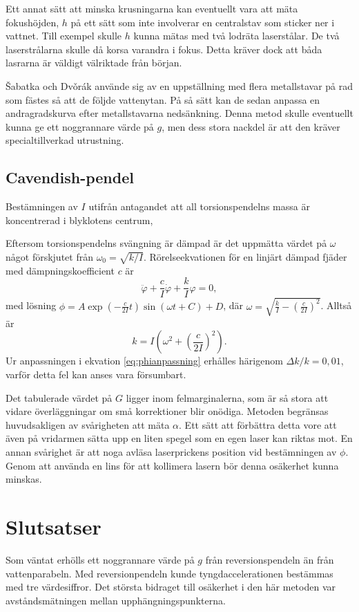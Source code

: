 \documentclass[11pt,a4paper]{article}
\begin{document}
Ett annat sätt att minska krusningarna kan eventuellt vara att mäta fokushöjden, $h$ på ett sätt som inte involverar en centralstav som sticker ner i vattnet. Till exempel skulle $h$ kunna mätas med två lodräta laserstålar. De två laserstrålarna skulle då korsa varandra i fokus. Detta kräver dock att båda lasrarna är väldigt välriktade från början.

\v{S}abatka och Dv\v{o}rák\cite{Sabatka2010} använde sig av en uppställning med flera metallstavar på rad som fästes så att de följde vattenytan. På så sätt kan de sedan anpassa en andragradskurva efter metallstavarna nedsänkning. Denna metod skulle eventuellt kunna ge ett noggrannare värde på $g$, men dess stora nackdel är att den kräver specialtillverkad utrustning. 


\subsection{Cavendish-pendel}\label{sec:cavkorr}
Bestämningen av $I$ utifrån antagandet att all torsionspendelns massa är koncentrerad i blyklotens centrum,

Eftersom torsionspendelns svängning är dämpad är det uppmätta värdet på $\omega$ något förskjutet från $\omega_0=\sqrt{k/I}$. Rörelseekvationen för en linjärt dämpad fjäder med dämpningskoefficient $c$ är
\[ \ddot \varphi + \frac{c}{I}\dot \varphi + \frac{k}{I}\varphi = 0,\]
med lösning $\phi=A\exp\left(-\frac{c}{2I}t\right)\sin(\omega t+C)+D$, där 
$\omega =\sqrt{\frac{k}{I}-\left(\frac{c}{2I}\right)^2}$. Alltså är
\[k = I\left( \omega^2+\left(\frac{c}{2I}\right)^2 \right). \]
Ur anpassningen i ekvation \eqref{eq:phianpassning} erhålles härigenom $\Delta k/k = 0,01$, varför detta fel kan anses vara försumbart.

Det tabulerade värdet på $G$ ligger inom felmarginalerna, som är så stora att vidare överläggningar om små korrektioner blir onödiga. Metoden begränsas huvudsakligen av svårigheten att mäta $\alpha$. Ett sätt att förbättra detta vore att även på vridarmen sätta upp en liten spegel som en egen laser kan riktas mot. En annan svårighet är att noga avläsa laserprickens position vid bestämningen av $\phi$. Genom att använda en lins för att kollimera lasern bör denna osäkerhet kunna minskas.

\section{Slutsatser}
Som väntat erhölls ett noggrannare värde på $g$ från reversionspendeln än från vattenparabeln. Med reversionpendeln kunde tyngdaccelerationen bestämmas med tre värdesiffror. Det största bidraget till osäkerhet i den här metoden var avståndsmätningen mellan upphängningspunkterna.
\end{document}
